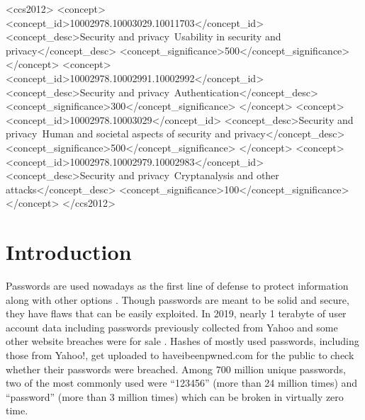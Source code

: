 \documentclass[acmsmall,nonacm]{acmart}
\begin{document}
\begin{CCSXML}
<ccs2012>
   <concept>
       <concept_id>10002978.10003029.10011703</concept_id>
       <concept_desc>Security and privacy~Usability in security and privacy</concept_desc>
       <concept_significance>500</concept_significance>
       </concept>
   <concept>
       <concept_id>10002978.10002991.10002992</concept_id>
       <concept_desc>Security and privacy~Authentication</concept_desc>
       <concept_significance>300</concept_significance>
       </concept>
   <concept>
       <concept_id>10002978.10003029</concept_id>
       <concept_desc>Security and privacy~Human and societal aspects of security and privacy</concept_desc>
       <concept_significance>500</concept_significance>
       </concept>
   <concept>
       <concept_id>10002978.10002979.10002983</concept_id>
       <concept_desc>Security and privacy~Cryptanalysis and other attacks</concept_desc>
       <concept_significance>100</concept_significance>
       </concept>
 </ccs2012>
\end{CCSXML}




\maketitle

\section{Introduction}
Passwords are used nowadays as the first line of defense to protect information along with other options \cite{ma_2010}. Though passwords are meant to be solid and secure, they have flaws that can be easily exploited. In 2019, nearly 1 terabyte of user account data including passwords previously collected from Yahoo and some other website breaches were for sale \cite{hunt_2019}. Hashes of mostly used passwords, including those from Yahoo!, get uploaded to haveibeenpwned.com for the public to check whether their passwords were breached. Among 700 million unique passwords, two of the most commonly used were “123456” (more than 24 million times) and “password” (more than 3 million times) which can be broken in virtually zero time.
\end{document}
